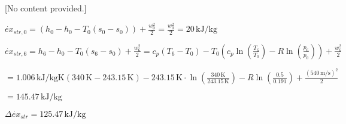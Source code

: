 [No content provided.]

\( \dot{ex}_{str,0} = (h_0 - h_0 - T_0(s_0 - s_0)) + \frac{w_0^2}{2} = \frac{w_0^2}{2} = 20 \, \text{kJ/kg} \)  

\( \dot{ex}_{str,6} = h_6 - h_0 - T_0(s_6 - s_0) + \frac{w_6^2}{2} = c_p(T_6 - T_0) - T_0(c_p \ln \left(\frac{T_6}{T_0}\right) - R \ln \left(\frac{p_6}{p_0}\right)) + \frac{w_6^2}{2} \)  

\( = 1.006 \, \text{kJ/kgK} \left(340 \, \text{K} - 243.15 \, \text{K}\right) - 243.15 \, \text{K} \cdot \ln \left(\frac{340 \, \text{K}}{243.15 \, \text{K}}\right) - R \ln \left(\frac{0.5}{0.191}\right) + \frac{(540 \, \text{m/s})^2}{2} \)  

\( = 145.47 \, \text{kJ/kg} \)  

\( \Delta \dot{ex}_{str} = 125.47 \, \text{kJ/kg} \)